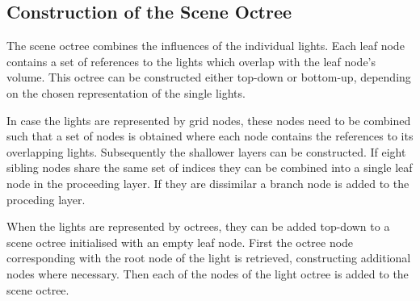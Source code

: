 

\subsection{Construction of the Scene Octree}

The scene octree combines the influences of the individual lights. Each leaf node
contains a set of references to the lights which overlap with the leaf node's volume.
This octree can be constructed either top-down or bottom-up, depending on the chosen
representation of the single lights.

In case the lights are represented by grid nodes, these nodes need to be combined such
that a set of nodes is obtained where each node contains the references to its overlapping
lights. Subsequently the shallower layers can be constructed. If eight sibling nodes share
the same set of indices they can be combined into a single leaf node in the proceeding
layer. If they are dissimilar a branch node is added to the proceding layer.

When the lights are represented by octrees, they can be added top-down to a scene
octree initialised with an empty leaf node. First the octree node corresponding with the
root node of the light is retrieved, constructing additional nodes where necessary.
Then each of the nodes of the light octree is added to the scene octree.


